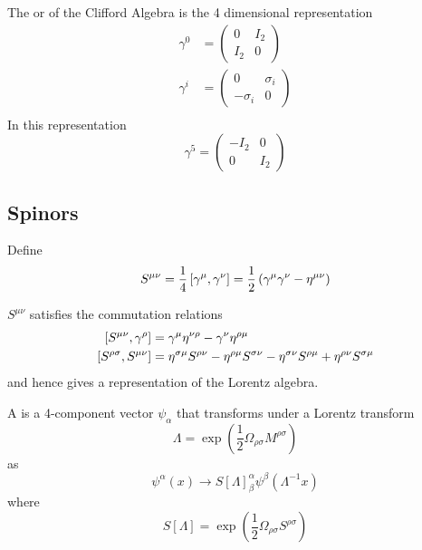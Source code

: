 \documentclass{article}
\begin{document}
\begin{definition}
The  or  of the Clifford Algebra is the 4 dimensional representation
\begin{align*}
    \gamma^0 &= \begin{pmatrix} 0 & I_2 \\ I_2 & 0 \end{pmatrix} \\
    \gamma^i &= \begin{pmatrix} 0 & \sigma_i \\ -\sigma_i & 0 \end{pmatrix} \\ 
\end{align*}
In this representation 
\[
\gamma^5=\begin{pmatrix} -I_2 & 0 \\ 0 & I_2 \end{pmatrix}
\]
\end{definition}

\subsection{Spinors}

\begin{definition}[$S^{\mu\nu}$]
Define
\[
S^{\mu\nu}=\frac{1}{4}\comm[\gamma^\mu]{\gamma^\nu}=\frac{1}{2}\left( \gamma^\mu \gamma^\nu -\eta^{\mu\nu} \right)
\]
\end{definition}

\begin{theorem}
$S^{\mu\nu}$ satisfies the commutation relations
\begin{align*}
\comm[S^{\mu\nu}]{\gamma^\rho} &= \gamma^\mu \eta^{\nu\rho}-\gamma^\nu \eta^{\rho\mu} \\
\comm[S^{\rho\sigma}]{S^{\mu\nu}} &= \eta^{\sigma\mu}S^{\rho\nu}-\eta^{\rho\mu}S^{\sigma\nu}-\eta^{\sigma\nu}S^{\rho\mu}+\eta^{\rho\nu}S^{\sigma\mu}
\end{align*}
and hence gives a representation of the Lorentz algebra.
\end{theorem}

\begin{definition}[Spinor]
A  is a 4-component vector $\psi_\alpha$ that transforms under a Lorentz transform 
\[
\Lambda=\exp\left(\frac{1}{2}\Omega_{\rho\sigma}M^{\rho\sigma}\right)
\]
as 
\[
\psi^{\alpha}(x)\to S[\Lambda]_{\beta}^{\alpha}\psi^{\beta}\left(\Lambda^{-1}x\right)
\]
where
\[
S[\Lambda]=\exp\left(\frac{1}{2}\Omega_{\rho\sigma}S^{\rho\sigma}\right)
\]
\end{definition}
\end{document}
